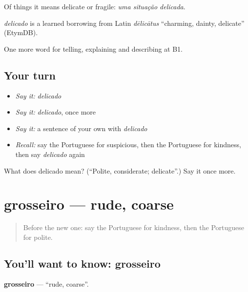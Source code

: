 Of things it means delicate or fragile: \emph{uma situação delicada}.

\begin{cousinweb}
\emph{delicado} is a learned borrowing from Latin \emph{dēlicātus} \textquotedblleft{}charming, dainty, delicate\textquotedblright{} (EtymDB).
\end{cousinweb}

\begin{grammarlens}[title={What you've built}]
One more word for telling, explaining and describing at B1.
\end{grammarlens}

\subsection*{Your turn}
\begin{itemize}
\raggedright
  \item \emph{Say it:} \emph{delicado}
  \item \emph{Say it:} \emph{delicado}, once more
  \item \emph{Say it:} a sentence of your own with \emph{delicado}
  \item \emph{Recall:} say the Portuguese for suspicious, then the Portuguese for kindness, then say \emph{delicado} again
\end{itemize}

\begin{tcolorbox}[breakable,colback=teal!4,colframe=teal!35!black,title={Before you move on}]
What does delicado mean? (\textquotedblleft{}Polite, considerate; delicate\textquotedblright{}.) Say it once more.
\end{tcolorbox}
\section[grosseiro]{grosseiro — rude, coarse}

\label{lesson:PT-C473-grosseiro}



\begin{quote}
Before the new one: say the Portuguese for kindness, then the Portuguese for polite.
\end{quote}

\subsection*{You'll want to know: grosseiro}
\textbf{grosseiro} — \textquotedblleft{}rude, coarse\textquotedblright{}.

